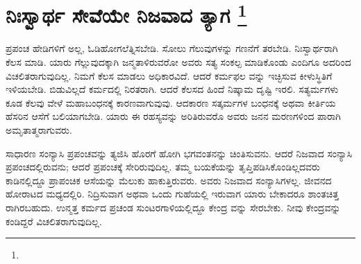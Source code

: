 
\chapter[ನಿಃಸ್ವಾರ್ಥ ಸೇವೆಯೇ ನಿಜವಾದ ತ್ಯಾಗ ]{ನಿಃಸ್ವಾರ್ಥ ಸೇವೆಯೇ ನಿಜವಾದ ತ್ಯಾಗ \protect\footnote{}}

ಪ್ರಪಂಚ ಹೇಡಿಗಳಿಗೆ ಅಲ್ಲ, ಓಡಿಹೋಗಲೆತ್ನಿಸಬೇಡಿ. ಸೋಲು ಗೆಲುವುಗಳನ್ನು ಗಣನೆಗೆ ತರಬೇಡಿ. ನಿಃಸ್ವಾರ್ಥರಾಗಿ ಕೆಲಸ ಮಾಡಿ. ಯಾರು ಗೆಲ್ಲುವುದಕ್ಕಾಗಿ ಜನ್ಮತಾಳಿರುವರೋ ಅವರು ಸತ್ಯ ಸಂಕಲ್ಪ ಮಾಡಿಕೊಂಡು ಎಂದಿಗೂ ಅದರಿಂದ ವಿಚಲಿತರಾಗುವುದಿಲ್ಲ. ನಿಮಗೆ ಕೆಲಸ ಮಾಡಲು ಅಧಿಕಾರವಿದೆ. ಆದರೆ ಕರ್ಮಫಲ ವನ್ನು ಇಚ್ಛಿಸುವ ಕೀಳುಸ್ಥಿತಿಗೆ ಇಳಿಯಬೇಡಿ. ಬಿಡುವಿಲ್ಲದೆ ಕರ್ಮದಲ್ಲಿ ನಿರತರಾಗಿ. ಆದರೆ ಕೆಲಸದ ಹಿಂದೆ ನಿಷ್ಕಾಮ ದೃಷ್ಟಿ ಇರಲಿ. ಸತ್ಯರ್ಮಗಳು ಕೂಡ ಕೆಲವು ವೇಳೆ ಮಹಾಬಂಧನಕ್ಕೆ ಕಾರಣವಾಗುವುವು. ಆದಕಾರಣ ಸತ್ಕರ್ಮಗಳ ಬಂಧನಕ್ಕೆ ಅಥವಾ ಕೀರ್ತಿಯ ಹೆಸರಿನ ಆಸೆಗೆ ಬಲಿಯಾಗಬೇಡಿ. ಯಾರು ಈ ರಹಸ್ಯವನ್ನು ಅರಿತಿರುವರೊ ಅವರು ಜನನ ಮರಣಗಳಿಂದ ಪಾರಾಗಿ ಅಮೃತಾತ್ಮರಾಗುವರು.

ಸಾಧಾರಣ ಸಂನ್ಯಾಸಿ ಪ್ರಪಂಚವನ್ನು ತ್ಯಜಿಸಿ ಹೊರಗೆ ಹೋಗಿ ಭಗವಂತನನ್ನು ಚಿಂತಿಸುವನು. ಆದರೆ ನಿಜವಾದ ಸಂನ್ಯಾಸಿ ಪ್ರಪಂಚದಲ್ಲಿರುವನು; ಆದರೆ ಪ್ರಪಂಚಕ್ಕೆ ಸೇರಿರುವುದಿಲ್ಲ. ತಮ್ಮ ಬಯಕೆಯನ್ನು ತೃಪ್ತಿಪಡಿಸಿಕೊಂಡಿಲ್ಲದವರು ಕಾಡಿನಲ್ಲಿದ್ದೂ ಪ್ರಾಪಂಚಿಕ ಆಸೆಯನ್ನು ಮೆಲುಕು ಹಾಕುತ್ತಿರುವರು. ಅವರು ನಿಜವಾದ ಸಂನ್ಯಾಸಿಗಳಲ್ಲ. ಜೀವನದ ಹೋರಾಟದ ಮಧ್ಯದಲ್ಲಿರಿ. ನಿದ್ರಿಸುವಾಗ ಅಥವಾ ಒಂದು ಗುಹೆಯಲ್ಲಿ ಇರುವಾಗ ಯಾರು ಬೇಕಾದರೂ ಶಾಂತಚಿತ್ತ ರಾಗಿರಬಹುದು. ಉನ್ಮತ್ತ ಕರ್ಮದ ಪ್ರಚಂಡ ಸುಂಟರಗಾಳಿಯಲ್ಲಿದ್ದೂ ಕೇಂದ್ರ ವನ್ನು ಸೇರಬೇಕು. ನೀವು ಕೇಂದ್ರವನ್ನು ಕಂಡಿದ್ದರೆ ವಿಚಲಿತರಾಗುವುದಿಲ್ಲ.

